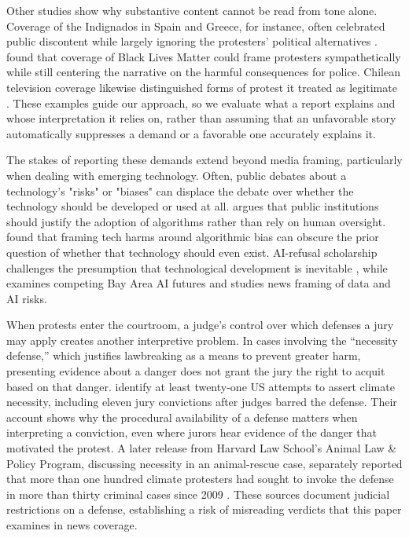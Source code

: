 \documentclass[11pt]{article}
\begin{document}
Other studies show why substantive content cannot be read from tone alone. Coverage of the Indignados in Spain and Greece, for instance, often celebrated public discontent while largely ignoring the protesters' political alternatives \citep{indignados}. \citet{umamaheswar} found that coverage of Black Lives Matter could frame protesters sympathetically while still centering the narrative on the harmful consequences for police. Chilean television coverage likewise distinguished forms of protest it treated as legitimate \citep{chile}. These examples guide our approach, so we evaluate what a report explains and whose interpretation it relies on, rather than assuming that an unfavorable story automatically suppresses a demand or a favorable one accurately explains it.

The stakes of reporting these demands extend beyond media framing, particularly when dealing with emerging technology. Often, public debates about a technology's "risks" or "biases" can displace the debate over whether the technology should be developed or used at all. \citet{green} argues that public institutions should justify the adoption of algorithms rather than rely on human oversight. \citet{katell} found that framing tech harms around algorithmic bias can obscure the prior question of whether that technology should even exist. AI-refusal scholarship challenges the presumption that technological development is inevitable \citep{lynch,mansouri}, while \citet{hepp} examines competing Bay Area AI futures and \citet{nguyen} studies news framing of data and AI risks.

When protests enter the courtroom, a judge's control over which defenses a jury may apply creates another interpretive problem. In cases involving the ``necessity defense,'' which justifies lawbreaking as a means to prevent greater harm, presenting evidence about a danger does not grant the jury the right to acquit based on that danger. \citet[pp.~61, 108--114]{long} identify at least twenty-one US attempts to assert climate necessity, including eleven jury convictions after judges barred the defense. Their account shows why the procedural availability of a defense matters when interpreting a conviction, even where jurors hear evidence of the danger that motivated the protest. A later release from Harvard Law School's Animal Law \& Policy Program, discussing necessity in an animal-rescue case, separately reported that more than one hundred climate protesters had sought to invoke the defense in more than thirty criminal cases since 2009 \citep{harvard}. These sources document judicial restrictions on a defense, establishing a risk of misreading verdicts that this paper examines in news coverage.
\end{document}
